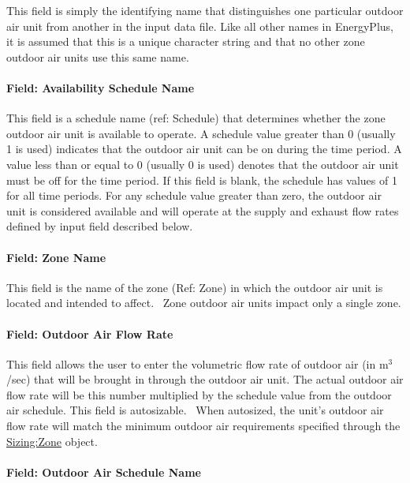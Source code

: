 This field is simply the identifying name that distinguishes one particular outdoor air unit from another in the input data file. Like all other names in EnergyPlus, it is assumed that this is a unique character string and that no other zone outdoor air units use this same name.

\paragraph{Field: Availability Schedule Name}\label{field-availability-schedule-name-5-005}

This field is a schedule name (ref: Schedule) that determines whether the zone outdoor air unit is available to operate. A schedule value greater than 0 (usually 1 is used) indicates that the outdoor air unit can be on during the time period. A value less than or equal to 0 (usually 0 is used) denotes that the outdoor air unit must be off for the time period. If this field is blank, the schedule has values of 1 for all time periods. For any schedule value greater than zero, the outdoor air unit is considered available and will operate at the supply and exhaust flow rates defined by input field described below.

\paragraph{Field: Zone Name}\label{field-zone-name-016}

This field is the name of the zone (Ref: Zone) in which the outdoor air unit is located and intended to affect.~ Zone outdoor air units impact only a single zone.

\paragraph{Field: Outdoor Air Flow Rate}\label{field-outdoor-air-flow-rate}

This field allows the user to enter the volumetric flow rate of outdoor air (in m\(^{3}\)/sec) that will be brought in through the outdoor air unit. The actual outdoor air flow rate will be this number multiplied by the schedule value from the outdoor air schedule. This field is autosizable.~ When autosized, the unit's outdoor air flow rate will match the minimum outdoor air requirements specified through the \hyperref[sizingzone]{Sizing:Zone} object.

\paragraph{Field: Outdoor Air Schedule Name}\label{field-outdoor-air-schedule-name-1}

